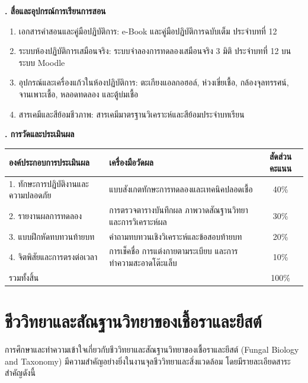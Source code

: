 \noindent\textbf{. สื่อและอุปกรณ์การเรียนการสอน}

\begin{enumerate}
    \item เอกสารคำสอนและคู่มือปฏิบัติการ: e-Book และคู่มือปฏิบัติการฉบับเต็ม ประจำบทที่ 12
    \item ระบบห้องปฏิบัติการเสมือนจริง: ระบบจำลองการทดลองเสมือนจริง 3 มิติ ประจำบทที่ 12 บนระบบ Moodle
    \item อุปกรณ์และเครื่องแก้วในห้องปฏิบัติการ: ตะเกียงแอลกอฮอล์, ห่วงเขี่ยเชื้อ, กล้องจุลทรรศน์, จานเพาะเชื้อ, หลอดทดลอง และตู้บ่มเชื้อ
    \item สารเคมีและสีย้อมชีวภาพ: สารเคมีมาตรฐานวิเคราะห์และสีย้อมประจำบทเรียน
\end{enumerate}

\noindent\textbf{. การวัดและประเมินผล}

\begin{table}[H]
\centering\small
\begin{tabularx}{\textwidth}{p{} p{} c}
\toprule
\textbf{องค์ประกอบการประเมินผล} & \textbf{เครื่องมือวัดผล} & \textbf{สัดส่วนคะแนน} \\
\midrule
1. ทักษะการปฏิบัติงานและความปลอดภัย & แบบสังเกตทักษะการทดลองและเทคนิคปลอดเชื้อ & 40\% \\
2. รายงานผลการทดลอง & การตรวจตารางบันทึกผล ภาพวาดสัณฐานวิทยา และการวิเคราะห์ผล & 30\% \\
3. แบบฝึกหัดทบทวนท้ายบท & คำถามทบทวนเชิงวิเคราะห์และข้อสอบท้ายบท & 20\% \\
4. จิตพิสัยและการตรงต่อเวลา & การเช็คชื่อ การแต่งกายตามระเบียบ และการทำความสะอาดโต๊ะแล็บ & 10\% \\
รวมทั้งสิ้น &  & 100\% \\
\bottomrule
\end{tabularx}
\end{table}

\newpage


\section{ชีววิทยาและสัณฐานวิทยาของเชื้อราและยีสต์}

การศึกษาและทำความเข้าใจเกี่ยวกับชีววิทยาและสัณฐานวิทยาของเชื้อราและยีสต์ (Fungal Biology and Taxonomy) มีความสำคัญอย่างยิ่งในงานจุลชีววิทยาและสิ่งแวดล้อม โดยมีรายละเอียดสาระสำคัญดังนี้

